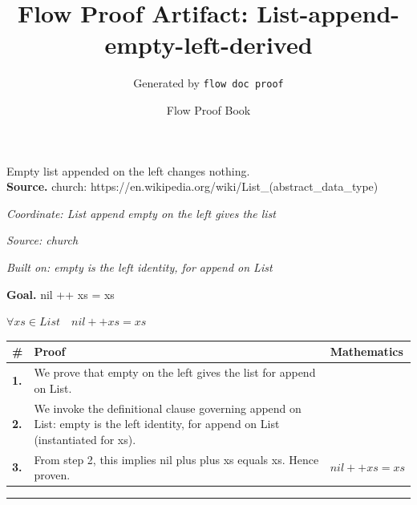 \documentclass[11pt]{article}
\title{Flow Proof Artifact: List-append-empty-left-derived}
\author{Generated by \texttt{flow doc proof}}
\date{Flow Proof Book}
\theoremstyle{definition}
\begin{document}
\maketitle
Empty list appended on the left changes nothing.\\[0.5em]
\textbf{Source.} church: https://en.wikipedia.org/wiki/List\_(abstract\_data\_type)\\[0.5em]
\bigskip
{}\par
\smallskip\noindent\textit{Coordinate: List \cdot append \cdot empty on the left gives the list}\par
\smallskip\noindent\textit{Source: church}\par
\smallskip\noindent\textit{Built on: empty is the left identity, for append on List}\par
\medskip
\noindent\textbf{Goal.} nil ++ xs = xs\par
\noindent$\displaystyle \forall xs \in List\quad nil ++ xs = xs$\par
\medskip
\noindent
\begin{tabular}{@{} >{\raggedright\arraybackslash}p{} >{\raggedright\arraybackslash}p{} >{\raggedleft\arraybackslash}p{} @{}}
\textbf{\#} & \textbf{Proof} & \textbf{Mathematics} \\
\midrule
\textbf{1.} & We prove that empty on the left gives the list for append on List. & \\[0.45em]
\textbf{2.} & We invoke the definitional clause governing append on List: empty is the left identity, for append on List (instantiated for xs). & \\[0.45em]
\textbf{3.} & From step 2, this implies nil plus plus xs equals xs. Hence proven. & $\displaystyle nil ++ xs = xs$ \\[0.45em]
\bottomrule
\end{tabular}
\label{thm:List-append-empty_on_the_left_gives_the_list}
\par\medskip\hrule
\end{document}
